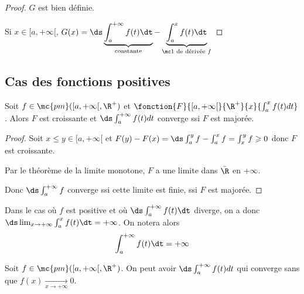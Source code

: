 \begin{proof}
    $G$ est bien définie. 

    Si $x \in [a, + \infty[$, $G(x) = \ds \underbrace{\int_{a}^{+ \infty } f(t) \dt}_{\text{constante}} - \underbrace{\int_a^x f(t) \dt}_{\mc 1 \text{ de dérivée } f}$
\end{proof}

\subsection{Cas des fonctions positives}

\begin{proposition}{}{}
    Soit $f \in \mc{pm}([a, + \infty[, \R^+)$ et $\fonction{F}{[a, + \infty[}{\R^+}{x}{\int_a^x f(t) dt}$.
    Alors $F$ est croissante et $\ds \int_a^{+ \infty} f(t) dt$ converge ssi $F$ est majorée.
\end{proposition}

\begin{proof}
    Soit $x \leqslant y \in [a, +\infty[$ et $F(y) - F(x) = \ds \int_a^y f - \int_a^x f = \int_x^y f \geqslant 0$ donc $F$ est croissante.

    Par le théorème de la limite monotone, $F$ a une limite dans $\bar \R$ en $+\infty$.

    Donc $\ds \int_{a }^{+\infty   } f$ converge ssi cette limite est finie, ssi $F$ est majorée.
\end{proof}

\begin{remarque}
    Dans le cas où $f$ est positive et où $\ds \int_{a }^{+ \infty   } f(t) \dt$ diverge, on a 
    donc $\ds \lim_{x \to + \infty   } \int_{a }^{x } f(t) \dt = + \infty$.
    On notera alors 
    $$\int_{a }^{+ \infty   } f(t) \dt = + \infty$$
\end{remarque}



\begin{proposition}{}{}
    Soit $f \in \mc{pm}([a, + \infty[, \R^+)$. On peut avoir $\ds \int_a^{+ \infty} f(t) dt$ 
    qui converge sans que $f(x) \xrightarrow[x \to + \infty   ]{} 0$.
\end{proposition}

